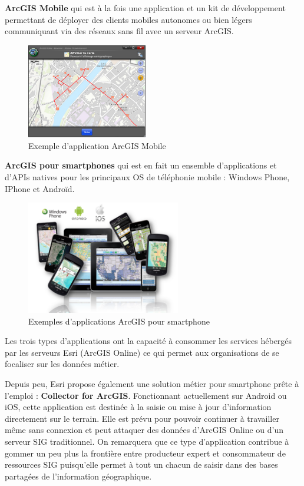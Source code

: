 \documentclass[11pt]{article}
\begin{document}
\textbf{ArcGIS Mobile} qui est à la fois une application et un kit de développement permettant de déployer des clients mobiles autonomes ou bien légers communiquant via des réseaux sans fil avec un serveur ArcGIS.
\begin{figure}[H]
	\center \includegraphics[width=0.47\textwidth]{img/cours/arcgis_mobile.png}
	\caption{Exemple d'application ArcGIS Mobile}
\end{figure}

\textbf{ArcGIS pour smartphones} qui est en fait un ensemble d'applications et d'APIs natives pour les principaux OS de téléphonie mobile : Windows Phone, IPhone et Androïd. 

\begin{figure}[H]
	\center \includegraphics[width=0.6\textwidth]{img/cours/arcgis_for_smartphone.png}
	\caption{Exemples d'applications ArcGIS pour smartphone}
\end{figure}

Les trois types d'applications ont la capacité à consommer les services hébergés par les serveurs Esri (ArcGIS Online) ce qui permet aux organisations de se focaliser sur les données métier.

Depuis peu, Esri propose également une solution métier pour smartphone prête à l'emploi : \textbf{Collector for ArcGIS}. Fonctionnant actuellement sur Android ou iOS, cette application est destinée à la saisie ou mise à jour d'information directement sur le terrain. Elle est prévu pour pouvoir continuer à travailler même sans connexion et peut attaquer des données d'ArcGIS Online ou d'un serveur SIG traditionnel. On remarquera que ce type d'application contribue à gommer un peu plus la frontière entre producteur expert et consommateur de ressources SIG puisqu'elle permet à tout un chacun de saisir dans des bases partagées de l'information géographique.
\end{document}
